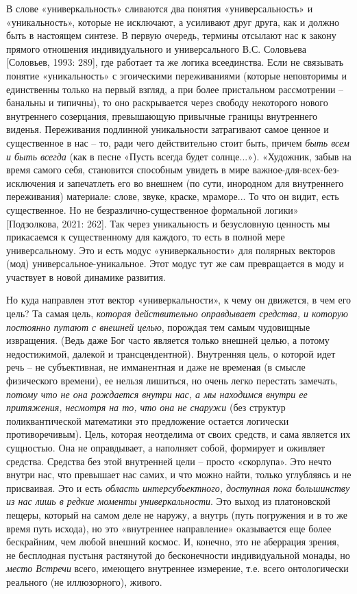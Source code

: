     В слове «универкальность» сливаются два понятия «универсальность» и «уникальность», которые не исключают, а усиливают друг друга, как и должно быть в настоящем синтезе. В первую очередь, термины отсылают нас к закону прямого отношения индивидуального и универсального В.С. Соловьева [Соловьев, 1993: 289], где работает та же логика всеединства. Если не связывать понятие «уникальность» с эгоическими переживаниями (которые неповторимы и единственны только на первый взгляд, а при более пристальном рассмотрении – банальны и типичны), то оно раскрывается через свободу некоторого нового внутреннего созерцания, превышающую привычные границы внутреннего виденья. Переживания подлинной уникальности затрагивают самое ценное и существенное в нас – то, ради чего действительно стоит быть, причем \textit{быть всем и быть всегда }(как в песне «Пусть всегда будет солнце...»). «Художник, забыв на время самого себя, становится способным увидеть в мире важное-для-всех-без-исключения и запечатлеть его во внешнем (по сути, инородном для внутреннего переживания) материале: слове, звуке, краске, мраморе... То что он видит, есть существенное. Но не безразлично-существенное формальной логики» [Подзолкова, 2021: 262]. Так через уникальность и безусловную ценность мы прикасаемся к существенному для каждого, то есть в полной мере универсальному. Это и есть модус «универкальности» для полярных векторов (мод) универсальное-уникальное. Этот модус тут же сам превращается в моду и участвует в новой динамике развития.

    Но куда направлен этот вектор «универкальности», к чему он движется, в чем его цель? Та самая цель, \textit{которая действительно оправдывает средства, и которую постоянно путают с внешней целью}, порождая тем самым чудовищные извращения. (Ведь даже Бог часто является только внешней целью, а потому недостижимой, далекой и трансцендентной). Внутренняя цель, о которой идет речь – не субъективная, не имманентная и даже не времен\textbf{а}я (в смысле физического времени), ее нельзя лишиться, но очень легко перестать замечать, \textit{потому что не она рождается внутри нас, а мы находимся внутри ее притяжения, несмотря на то, что она не снаружи }(без структур поликвантической математики это предложение остается логически противоречивым). Цель, которая неотделима от своих средств, и сама является их сущностью. Она не оправдывает, а наполняет собой, формирует и оживляет средства. Средства без этой внутренней цели – просто «скорлупа». Это нечто внутри нас, что превышает нас самих, и что можно найти, только углубляясь и не присваивая. Это и есть \textit{область} \textit{интерсубъектного, доступная пока большинству из нас лишь в редкие моменты универкальности}. Это выход из платоновской пещеры, который на самом деле не наружу, а внутрь (путь погружения и в то же время путь исхода), но это «внутреннее направление» оказывается еще более бескрайним, чем любой внешний космос. И, конечно, это не аберрация зрения, не бесплодная пустыня растянутой до бесконечности индивидуальной монады, но \textit{место Встречи} всего, имеющего внутреннее измерение, т.е. всего онтологически реального (не иллюзорного), живого.

